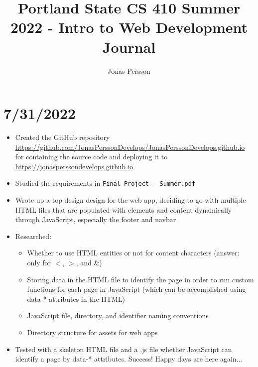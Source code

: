 \documentclass{article}
\begin{document}
	
	\title { Portland State CS 410 Summer 2022 - Intro to Web Development Journal }
	\author {Jonas Persson}
	\maketitle
	
	\newpage


\section*{7/31/2022}
\begin{itemize}
	\item Created the GitHub repository \newline \href{https://github.com/JonasPerssonDevelops/JonasPerssonDevelops.github.io}{https://github.com/JonasPerssonDevelops/JonasPerssonDevelops.github.io} \newline 
	for containing the source code and deploying it to \newline \href{https://jonasperssondevelops.github.com}{https://jonasperssondevelops.github.io}
	\item Studied the requirements in \texttt{Final Project - Summer.pdf}
	\item Wrote up a top-design design for the web app, deciding to go with multiple HTML files that are populated with elements and content dynamically through JavaScript, especially the footer and navbar
	\item Researched:
		\begin{itemize} 
        	\item Whether to use HTML entities or not for content characters (answer: only for $<$, $>$, and \&)
        	\item Storing data in the HTML file to identify the page in order to run custom functions for each page in JavaScript (which can be accomplished using data-* attributes in the HTML)
        	\item JavaScript file, directory, and identifier naming conventions
        	\item Directory structure for assets for web apps
		\end{itemize}
		\item Tested with a skeleton HTML file and a .js file whether JavaScript can identify a page by data-* attributes. Success! Happy days are here again...

\end{itemize}
\end{document}
